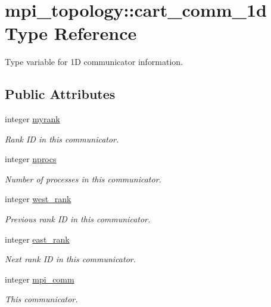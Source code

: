 \hypertarget{structmpi__topology_1_1cart__comm__1d}{}\section{mpi\+\_\+topology\+::cart\+\_\+comm\+\_\+1d Type Reference}
\label{structmpi__topology_1_1cart__comm__1d}


Type variable for 1D communicator information.  


\subsection*{Public Attributes}
\begin{DoxyCompactItemize}
\item 
integer \mbox{\hyperlink{structmpi__topology_1_1cart__comm__1d_a0b76696fcf5c27f5cfdc48e53a2671ef}{myrank}}
\begin{DoxyCompactList}\small\item\em Rank ID in this communicator. \end{DoxyCompactList}\item 
integer \mbox{\hyperlink{structmpi__topology_1_1cart__comm__1d_adf78d1be6ca59cada6cc444edde4c3fc}{nprocs}}
\begin{DoxyCompactList}\small\item\em Number of processes in this communicator. \end{DoxyCompactList}\item 
integer \mbox{\hyperlink{structmpi__topology_1_1cart__comm__1d_a63baa1f74126ffda0b67af1c487dcd45}{west\+\_\+rank}}
\begin{DoxyCompactList}\small\item\em Previous rank ID in this communicator. \end{DoxyCompactList}\item 
integer \mbox{\hyperlink{structmpi__topology_1_1cart__comm__1d_a550b10f02ed0c5a8469174df8b54f525}{east\+\_\+rank}}
\begin{DoxyCompactList}\small\item\em Next rank ID in this communicator. \end{DoxyCompactList}\item 
integer \mbox{\hyperlink{structmpi__topology_1_1cart__comm__1d_ab9d9b0c2f72db4fb74c0264691778a45}{mpi\+\_\+comm}}
\begin{DoxyCompactList}\small\item\em This communicator. \end{DoxyCompactList}\end{DoxyCompactItemize}


